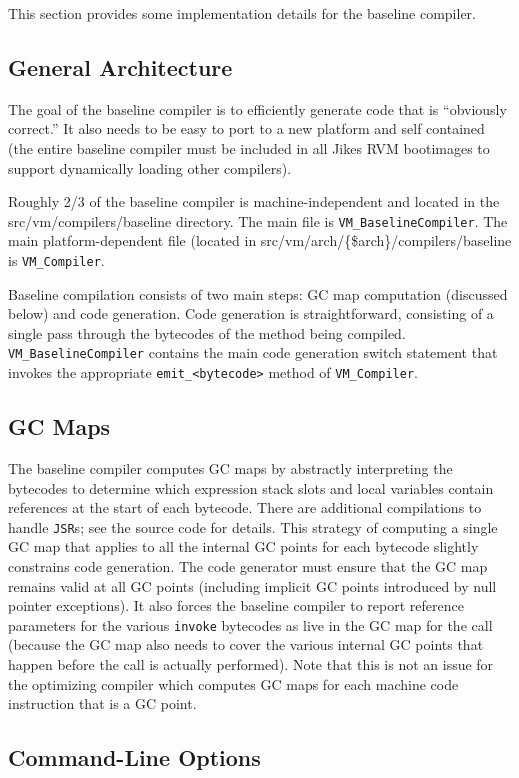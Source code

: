 This section provides some implementation details for the baseline
compiler. 

\subsection{General Architecture}
The goal of the baseline compiler is to efficiently generate code that
is ``obviously correct.'' It also needs to be easy to port to a new
platform and self contained (the entire baseline compiler must be
included in all Jikes RVM bootimages to support dynamically loading
other compilers). 

Roughly 2/3 of the baseline compiler is machine-independent and
located in the src/vm/compilers/baseline directory. The main file is
{\tt VM\_BaselineCompiler}. The main platform-dependent file (located
in src/vm/arch/\{\$arch\}/compilers/baseline is {\tt VM\_Compiler}. 

Baseline compilation consists of two main steps: GC map computation
(discussed below) and code generation.  Code generation is
straightforward, consisting of a single pass through the
bytecodes of the method being compiled. {\tt VM\_BaselineCompiler}
contains the main code generation switch statement that invokes the
appropriate {\tt emit\_<bytecode>} method of {\tt VM\_Compiler}. 

\subsection{GC Maps}
The baseline compiler computes GC maps by abstractly interpreting the
bytecodes to determine which expression stack slots and local
variables contain references at the start of each bytecode. There are
additional compilations to handle {\tt JSR}s; see the source code for
details. This strategy of computing a single GC map that applies to
all the internal GC points for each bytecode slightly constrains code
generation. The code generator must ensure that the GC map remains
valid at all GC points (including implicit GC points introduced by
null pointer exceptions). It also forces the baseline compiler to
report reference parameters for the various {\tt invoke} bytecodes as
live in the GC map for the call (because the GC map also needs to
cover the various internal GC points that happen before the call is
actually performed). Note that this is not an issue for the optimizing
compiler which computes GC maps for each machine code instruction that
is a GC point. 

\subsection{Command-Line Options}

